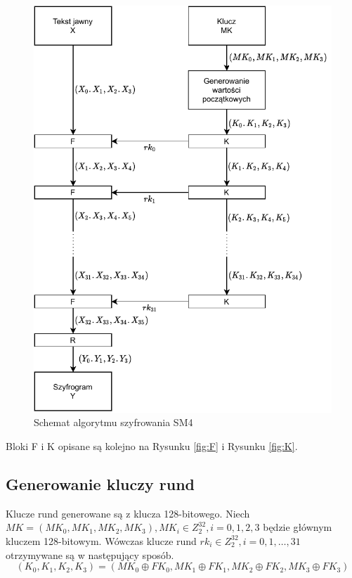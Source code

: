 \begin{figure}[H]
  \centering
  \includegraphics{diagramy/SM4.pdf}
  \caption{Schemat algorytmu szyfrowania SM4}
  \label{fig:SM4}
\end{figure}

Bloki F i K opisane są kolejno na Rysunku \ref{fig:F} i Rysunku \ref{fig:K}.

\subsection{Generowanie kluczy rund} \label{section:roundKeys}

Klucze rund generowane są z klucza 128-bitowego. Niech $MK = (MK_0, MK_1, MK_2, MK_3), MK_i \in Z^{32}_2, i = 0, 1, 2, 3$ będzie głównym kluczem 128-bitowym. Wówczas klucze rund $rk_i \in Z^{32}_2, i = 0, 1, \ldots, 31$ otrzymywane są w następujący sposób.
\begin{equation*}
    (K_0, K_1, K_2, K_3) = (MK_0 \oplus FK_0, MK_1 \oplus FK_1, MK_2 \oplus FK_2, MK_3 \oplus FK_3)
\end{equation*}

